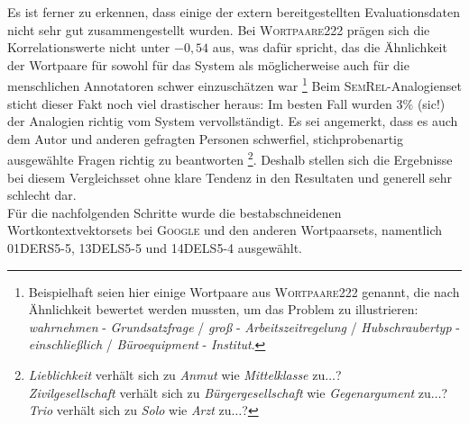   Es ist ferner zu erkennen, dass einige der extern bereitgestellten Evaluationsdaten nicht sehr gut zusammengestellt wurden.
  Bei \textsc{Wortpaare222} prägen sich die Korrelationswerte nicht unter $-0,54$ aus, was dafür spricht, das die Ähnlichkeit
  der Wortpaare für sowohl für das System als möglicherweise auch für die menschlichen Annotatoren schwer einzuschätzen war
  \footnote{Beispielhaft seien hier einige Wortpaare aus \textsc{Wortpaare222} genannt, die nach Ähnlichkeit bewertet werden
  mussten, um das Problem zu illustrieren:\\
  \emph{wahrnehmen} - \emph{Grundsatzfrage} / \emph{groß} - \emph{Arbeitszeitregelung} /
  \emph{Hubschraubertyp} - \emph{einschließlich} / \emph{Büroequipment} - \emph{Institut}.}
  Beim \textsc{SemRel}-Analogienset sticht dieser Fakt noch viel drastischer heraus: Im besten Fall wurden $3\%$ (sic!)
  der Analogien richtig vom System vervollständigt. Es sei angemerkt, dass es auch dem Autor und anderen gefragten Personen
  schwerfiel, stichprobenartig ausgewählte Fragen richtig zu beantworten
  \footnote{\emph{Lieblichkeit} verhält sich zu \emph{Anmut} wie \emph{Mittelklasse} zu$\ldots$? \\
  \emph{Zivilgesellschaft} verhält sich zu \emph{Bürgergesellschaft} wie \emph{Gegenargument} zu$\ldots$? \\
  \emph{Trio} verhält sich zu \emph{Solo}  wie \emph{Arzt} zu$\ldots$? }.
  Deshalb stellen sich die Ergebnisse bei diesem Vergleichsset ohne klare Tendenz in den Resultaten und generell sehr schlecht dar.\\

  Für die nachfolgenden Schritte wurde die bestabschneidenen Wortkontextvektorsets bei \textsc{Google} und den anderen
  Wortpaarsets, namentlich 01DERS5-5, 13DELS5-5 und 14DELS5-4 ausgewählt.
